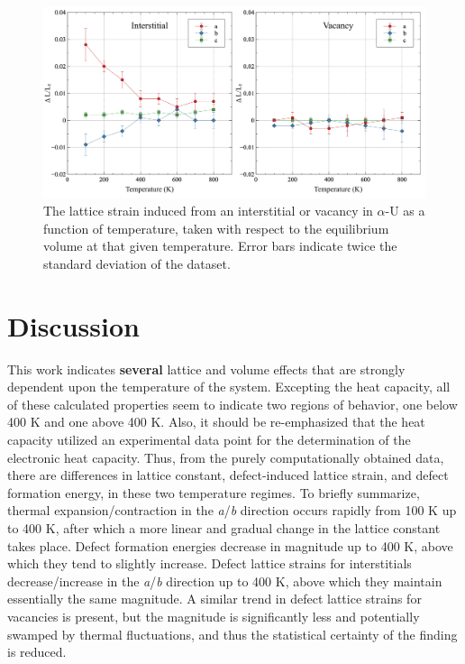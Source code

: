\documentclass[utf8]{frontiersSCNS} %
\providecommand{\DIFaddtex}[1]{{\bf #1}} %
\providecommand{\DIFdeltex}[1]{} %
\providecommand{\DIFaddbegin}{\protect\color{blue}} %
\providecommand{\DIFaddend}{\protect\color{black}} %
\providecommand{\DIFdelbegin}{\protect\color{red}} %
\providecommand{\DIFdelend}{\protect\color{black}} %
\providecommand{\DIFadd}[1]{\texorpdfstring{\DIFaddtex{#1}}{#1}} %
\providecommand{\DIFdel}[1]{\texorpdfstring{\DIFdeltex{#1}}{}} %
\begin{document}
 \begin{figure}[hbt]
	\centering
	\includegraphics[width=1.0\textwidth]{defect_strain.jpg}
  \caption{The lattice strain induced from an interstitial or vacancy in $\alpha$-U as a function of temperature, taken with respect to the equilibrium volume at that given temperature. Error bars indicate twice the standard deviation of the dataset.}\label{fig:strain}
\end{figure}

\FloatBarrier

\section{Discussion}

This work indicates \DIFdelbegin \DIFdel{a number of }\DIFdelend \DIFaddbegin \DIFadd{several }\DIFaddend lattice and volume effects that are strongly dependent upon the temperature of the system. Excepting the heat capacity, all of these calculated properties seem to indicate two regions of behavior, one below 400 K and one above 400 K. Also, it should be re-emphasized that the heat capacity utilized an experimental data point for the determination of the electronic heat capacity. Thus, from the purely computationally obtained data, there are differences in lattice constant, defect-induced lattice strain, and defect formation energy, in these two temperature regimes. To briefly summarize, thermal expansion\DIFdelbegin \DIFdel{expansion}\DIFdelend /contraction in the \textit{a}/\textit{b} direction occurs rapidly from 100 K up to 400 K, after which a more linear and gradual change in the lattice constant takes place. Defect formation energies decrease in magnitude up to 400 K, above which they tend to slightly increase. Defect lattice strains for interstitials decrease/increase in the \textit{a}/\textit{b} direction up to 400 K, above which they maintain essentially the same magnitude. A similar trend in defect lattice strains for vacancies is present, but the magnitude is significantly less and potentially swamped by thermal fluctuations, and thus the statistical certainty of the finding is reduced. 
\end{document}
